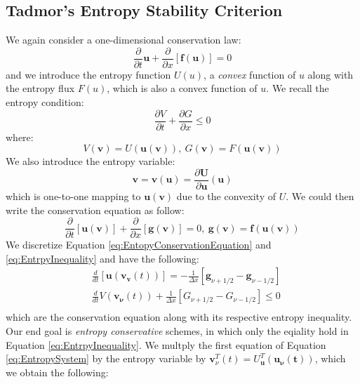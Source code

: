 \documentclass[a4paper]{article}
\numberwithin{equation}{section}
\begin{document}
\subsection{Tadmor's Entropy Stability Criterion}
We again consider a one-dimensional conservation law:
\begin{equation}
    \frac{\partial}{\partial t} \mathbf{u} + \frac{\partial}{\partial x}\left[\mathbf{f(u)}\right] = 0
\end{equation}
and we introduce the entropy function $U(u)$, a \textit{convex} function of $u$ along with the entropy flux $F(u)$, which is also a convex function of $u$. We recall the entropy condition:
\begin{equation}\label{eq:EntrpyInequality}
    \frac{\partial V}{\partial t} + \frac{\partial G}{\partial x} \leq 0
\end{equation}
where:
\begin{equation}
    V(\mathbf{v}) = U(\mathbf{u(v)}), \ G(\mathbf{v}) = F(\mathbf{u(v)})
\end{equation}
We also introduce the entropy variable:
\begin{equation}
    \mathbf{v} = \mathbf{v(u)} = \frac{\partial \mathbf
    U}{\partial \mathbf{u}}(\mathbf{u})
\end{equation}
which is one-to-one mapping to $\mathbf{u}(\mathbf{v})$ due to the convexity of $U$. We could then write the conservation equation as follow:
\begin{equation} \label{eq:EntopyConservationEquation}
    \frac{\partial}{\partial t}\left[\mathbf
    u(\mathbf
    v)\right] + \frac{\partial}{\partial x}\left[\mathbf
    g(\mathbf
    v)\right] = 0, \ \mathbf{g(v)} = \mathbf{f}(\mathbf{u}(\mathbf{
    v}))
\end{equation}
We discretize Equation \ref{eq:EntopyConservationEquation} and \ref{eq:EntrpyInequality} and have the following:
\begin{equation} \label{eq:EntropySystem}
    \begin{split}
        &\frac{d}{dt} \left[\mathbf{u}(\mathbf{v_v}(t))\right] = -\frac{1}{\Delta x}\left[\mathbf
        {g}_{\nu+1/2} - \mathbf{g}_{\nu-1/2}\right]\\
        &\frac{d}{dt} V(\mathbf{v_\nu}(t)) + \frac{1}{\Delta x}\left[G_{\nu + 1/2} - G_{\nu - 1/2}\right] \leq 0 \\
    \end{split}
\end{equation}
which are the conservation equation along with its respective entropy inequality. Our end goal is \textit{entropy conservative} schemes, in which only the eqiality hold in Equation \ref{eq:EntrpyInequality}. We multply the first equation of Equation \ref{eq:EntropySystem} by the entropy variable by $\mathbf{v}_\nu^T(t) = U_\mathbf{u}^T(\mathbf{u_\nu(t)})$, which we obtain the following:
\end{document}
